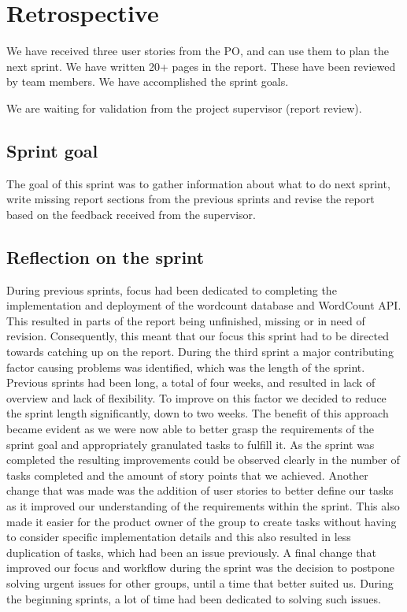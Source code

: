 \section{Retrospective}
We have received three user stories from the PO, and can use them to plan the next sprint.  We have written 20+ pages in the report. These have been reviewed by team members.  We have accomplished the sprint goals. 

We are waiting for validation from the project supervisor (report review).

\subsection{Sprint goal}
The goal of this sprint was to gather information about what to do next sprint, write missing report sections from the previous sprints and revise the report based on the feedback received from the supervisor. 

\subsection{Reflection on the sprint}
During previous sprints, focus had been dedicated to completing the implementation and deployment of the wordcount database and WordCount API. This resulted in parts of the report being unfinished, missing or in need of revision. Consequently, this meant that our focus this sprint had to be directed towards catching up on the report.
During the third sprint a major contributing factor causing problems was identified, which was the length of the sprint. Previous sprints had been long, a total of four weeks, and resulted in lack of overview and lack of flexibility. To improve on this factor we decided to reduce the sprint length significantly, down to two weeks. The benefit of this approach became evident as we were now able to better grasp the requirements of the sprint goal and appropriately granulated tasks to fulfill it. As the sprint was completed the resulting improvements could be observed clearly in the number of tasks completed and the amount of story points that we achieved. 
Another change that was made was the addition of user stories to better define our tasks as it improved our understanding of the requirements within the sprint. This also made it easier for the product owner of the group to create tasks without having to consider specific implementation details and this also resulted in less duplication of tasks, which had been an issue previously.
A final change that improved our focus and workflow during the sprint was the decision to postpone solving urgent issues for other groups, until a time that better suited us. During the beginning sprints, a lot of time had been dedicated to solving such issues.

